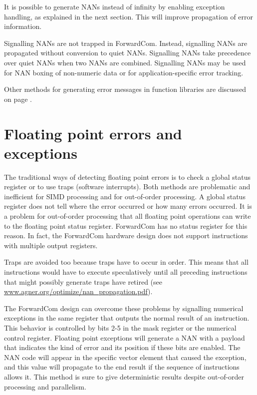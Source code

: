 \documentclass[forwardcom.tex]{subfiles}
\begin{document}
It is possible to generate NANs instead of infinity by enabling exception handling, as explained in the next section. This will improve propagation of error information. 
\vspace{2mm}

Signalling NANs are not trapped in ForwardCom. Instead, signalling NANs are propagated without conversion to quiet NANs. Signalling NANs take precedence over quiet NANs when two NANs are combined. Signalling NANs may be used for NAN boxing of non-numeric data or for application-specific error tracking.
\vspace{2mm}

Other methods for generating error messages in function libraries are discussed on page \pageref{errorMessageHandling}.
\vspace{2mm}


\section{Floating point errors and exceptions}
The traditional ways of detecting floating point errors is to check a global status register or to use traps (software interrupts). Both methods are problematic and inefficient for SIMD processing and for out-of-order processing. 
A global status register does not tell where the error occurred or how many errors occurred. It is a problem for out-of-order processing that all floating point operations can write to the floating point status register. 
ForwardCom has no status register for this reason. In fact, the ForwardCom hardware design does not support instructions with multiple output registers. 
\vspace{2mm}

Traps are avoided too because traps have to occur in order. This means that all instructions would have to execute speculatively until all preceding instructions that might possibly generate traps have retired (see  
\href{https://www.agner.org/optimize/nan_propagation.pdf}{www.agner.org/optimize/nan\_propagation.pdf}).
\vspace{2mm}

The ForwardCom design can overcome these problems by signalling numerical exceptions in the same register that outputs the normal result of an instruction. 
This behavior is controlled by bits 2-5 in the mask register or the numerical control register. Floating point exceptions will generate a NAN with a payload that indicates the kind of error and its position if these bits are enabled. The NAN code will appear in the specific vector element that caused the exception, and this value will propagate to the end result if the sequence of instructions allows it. This method is sure to give deterministic results despite out-of-order processing and parallelism.
\vspace{2mm}
\end{document}

